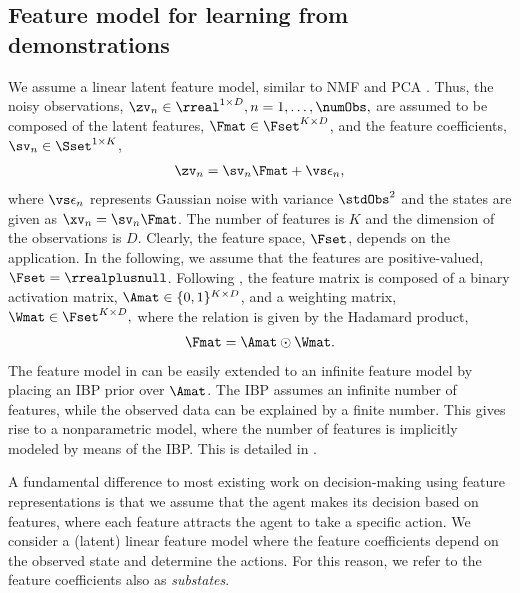 \documentclass{article}
\begin{document}
\subsection{Feature model for learning from demonstrations}
\label{sec::model::fl}
We assume a linear latent feature model, similar to \ac{NMF} \cite{Lee2001} and \ac{PCA} \cite{Jolliffe2002}. 
Thus, the noisy observations, $\zv_n \in \rreal^{1 \times D}, n=1,\ldots,\numObs,$ are assumed to be composed of the latent features, $\Fmat \in \Fset^{K \times D}$, and the feature coefficients, $\sv_n \in \Sset^{1 \times K}$,
\begin{align}
  \zv_n = \sv_n \Fmat + \vs \epsilon_n,
  \label{eq::choice::observation}
\end{align}
where $\vs \epsilon_n$ represents Gaussian \iid noise with variance $\stdObs^2$ and the states are given as $\xv_n =  \sv_n \Fmat$. The number of features is $K$ and the dimension of the observations is $D$.
Clearly, the feature space, $\Fset$, depends on the application.
In the following, we assume that the features are positive-valued, \ie $\Fset = \rrealplusnull$.
Following \cite{Knowles2011}, the feature matrix is composed of a binary activation matrix, $\Amat \in \{0, 1\}^{K \times D}$, and a weighting matrix, $\Wmat \in \Fset^{K \times D},$ where the relation is given by the Hadamard product,
\begin{align}
  \Fmat = \Amat \odot \Wmat.
  \label{eq::dm::feature::model}
\end{align}
The feature model in  can be easily extended to an infinite feature model by placing an \ac{IBP} \cite{Ghahramani2005,Griffiths2011} prior over $\Amat$. 
The \ac{IBP} assumes an infinite number of features, while the observed data can be explained by a finite number. 
This gives rise to a nonparametric model, where the number of features is implicitly modeled by means of the \ac{IBP}. This is detailed in .

A fundamental difference to most existing work on decision-making using feature representations is that we assume that the agent makes its decision based on features, where each feature attracts the agent to take a specific action.
We consider a (latent) linear feature model where the feature coefficients depend on the observed state and determine the actions. 
For this reason, we refer to the feature coefficients also as \emph{substates}.
\end{document}
